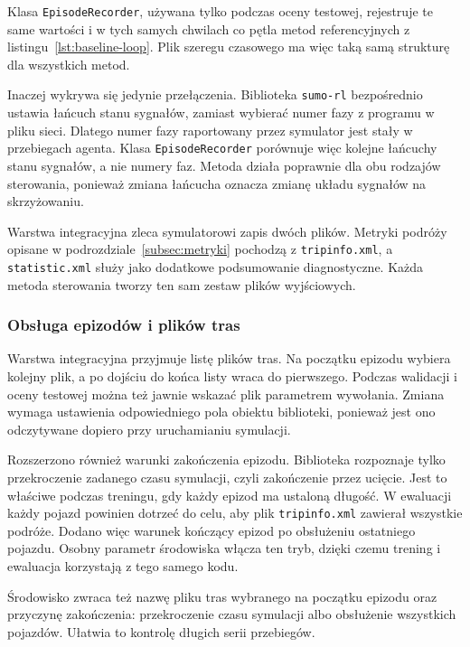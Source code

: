 Klasa \texttt{EpisodeRecorder}, używana tylko podczas oceny testowej, rejestruje te same wartości i w tych samych chwilach co pętla metod referencyjnych z listingu~\ref{lst:baseline-loop}. Plik szeregu czasowego ma więc taką samą strukturę dla wszystkich metod.

Inaczej wykrywa się jedynie przełączenia. Biblioteka \texttt{sumo-rl} bezpośrednio ustawia łańcuch stanu sygnałów, zamiast wybierać numer fazy z programu w pliku sieci. Dlatego numer fazy raportowany przez symulator jest stały w przebiegach agenta. Klasa \texttt{EpisodeRecorder} porównuje więc kolejne łańcuchy stanu sygnałów, a nie numery faz. Metoda działa poprawnie dla obu rodzajów sterowania, ponieważ zmiana łańcucha oznacza zmianę układu sygnałów na skrzyżowaniu.

Warstwa integracyjna zleca symulatorowi zapis dwóch plików. Metryki podróży opisane w podrozdziale~\ref{subsec:metryki} pochodzą z \texttt{tripinfo.xml}, a \texttt{statistic.xml} służy jako dodatkowe podsumowanie diagnostyczne. Każda metoda sterowania tworzy ten sam zestaw plików wyjściowych.

\subsubsection{Obsługa epizodów i plików tras}
\label{subsubsec:obsluga-epizodow}

Warstwa integracyjna przyjmuje listę plików tras. Na początku epizodu wybiera kolejny plik, a po dojściu do końca listy wraca do pierwszego. Podczas walidacji i oceny testowej można też jawnie wskazać plik parametrem wywołania. Zmiana wymaga ustawienia odpowiedniego pola obiektu biblioteki, ponieważ jest ono odczytywane dopiero przy uruchamianiu symulacji.

Rozszerzono również warunki zakończenia epizodu. Biblioteka rozpoznaje tylko przekroczenie zadanego czasu symulacji, czyli zakończenie przez ucięcie. Jest to właściwe podczas treningu, gdy każdy epizod ma ustaloną długość. W ewaluacji każdy pojazd powinien dotrzeć do celu, aby plik \texttt{tripinfo.xml} zawierał wszystkie podróże. Dodano więc warunek kończący epizod po obsłużeniu ostatniego pojazdu. Osobny parametr środowiska włącza ten tryb, dzięki czemu trening i ewaluacja korzystają z tego samego kodu.

Środowisko zwraca też nazwę pliku tras wybranego na początku epizodu oraz przyczynę zakończenia: przekroczenie czasu symulacji albo obsłużenie wszystkich pojazdów. Ułatwia to kontrolę długich serii przebiegów.

